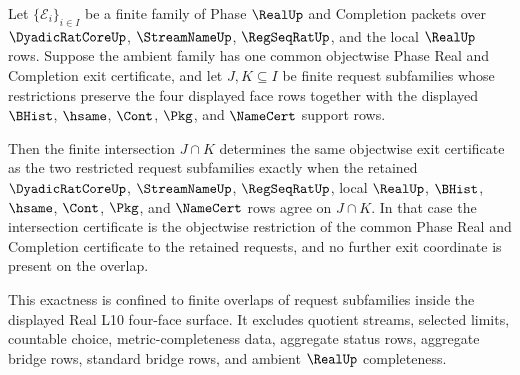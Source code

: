 \begin{theorem}
\label{thm:real-l10-finite-request-intersection-exit-exactness}
Let $\{\mathcal E_i\}_{i \in I}$ be a finite family of Phase $\RealUp$ and Completion packets over $\DyadicRatCoreUp$, $\StreamNameUp$, $\RegSeqRatUp$, and the local $\RealUp$ rows. Suppose the ambient family has one common objectwise Phase Real and Completion exit certificate, and let $J,K \subseteq I$ be finite request subfamilies whose restrictions preserve the four displayed face rows together with the displayed $\BHist$, $\hsame$, $\Cont$, $\Pkg$, and $\NameCert$ support rows.

Then the finite intersection $J \cap K$ determines the same objectwise exit certificate as the two restricted request subfamilies exactly when the retained $\DyadicRatCoreUp$, $\StreamNameUp$, $\RegSeqRatUp$, local $\RealUp$, $\BHist$, $\hsame$, $\Cont$, $\Pkg$, and $\NameCert$ rows agree on $J \cap K$. In that case the intersection certificate is the objectwise restriction of the common Phase Real and Completion certificate to the retained requests, and no further exit coordinate is present on the overlap.

This exactness is confined to finite overlaps of request subfamilies inside the displayed Real L10 four-face surface. It excludes quotient streams, selected limits, countable choice, metric-completeness data, aggregate status rows, aggregate bridge rows, standard bridge rows, and ambient $\RealUp$ completeness.
\end{theorem}
